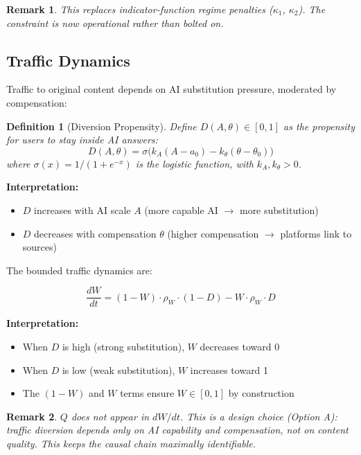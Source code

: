 \documentclass[11pt,a4paper]{article}
\newtheorem{definition}{Definition}
\newtheorem{remark}{Remark}
\begin{document}
\begin{remark}
This replaces indicator-function regime penalties ($\kappa_1$, $\kappa_2$). The constraint is now \emph{operational} rather than bolted on.
\end{remark}

\subsection{Traffic Dynamics}

Traffic to original content depends on AI substitution pressure, moderated by compensation:

\begin{definition}[Diversion Propensity]
Define $D(A, \theta) \in [0,1]$ as the propensity for users to stay inside AI answers:
\begin{equation}
D(A, \theta) = \sigma\Big(k_A(A - a_0) - k_\theta(\theta - \theta_0)\Big)
\end{equation}
where $\sigma(x) = 1/(1+e^{-x})$ is the logistic function, with $k_A, k_\theta > 0$.
\end{definition}

\textbf{Interpretation:}
\begin{itemize}
    \item $D$ increases with AI scale $A$ (more capable AI $\rightarrow$ more substitution)
    \item $D$ decreases with compensation $\theta$ (higher compensation $\rightarrow$ platforms link to sources)
\end{itemize}

The bounded traffic dynamics are:

\begin{equation}
\boxed{
\frac{dW}{dt} = (1-W) \cdot \rho_W \cdot (1-D) - W \cdot \rho_W \cdot D
}
\end{equation}

\textbf{Interpretation:}
\begin{itemize}
    \item When $D$ is high (strong substitution), $W$ decreases toward 0
    \item When $D$ is low (weak substitution), $W$ increases toward 1
    \item The $(1-W)$ and $W$ terms ensure $W \in [0,1]$ by construction
\end{itemize}

\begin{remark}
$Q$ does not appear in $dW/dt$. This is a design choice (Option A): traffic diversion depends only on AI capability and compensation, not on content quality. This keeps the causal chain maximally identifiable.
\end{remark}
\end{document}
